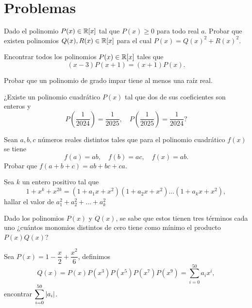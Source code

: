 \section{Problemas}

\begin{problem}
    Dado el polinomio $P(x) \in \mathbb{R} [x]$ tal que $P(x) \geq 0$ para todo real $a$.
    Probar que existen polinomios $Q(x), R(x) \in \mathbb{R} [x]$ para el cual $P(x) = Q(x)^2 + R(x)^2$.
\end{problem}

\begin{problem}
    Encontrar todos los polinomios $P(x) \in \mathbb{R}[x]$ tales que
    \[
        (x - 3)P(x + 1) = (x + 1)P(x).
    \]
\end{problem}

\begin{problem}
    Probar que un polinomio de grado impar tiene al menos una raíz real.
\end{problem}

\begin{problem}
    ¿Existe un polinomio cuadrático $P(x)$ tal que dos de sus coeficientes son enteros y
    \[
        P\left(\frac{1}{2024}\right) = \frac{1}{2025},  \quad P\left(\frac{1}{2025}\right) = \frac{1}{2024} ?
    \]
\end{problem}

\begin{problem}
    Sean $a,b, c$ números reales distintos tales que para el polinomio cuadrático $f(x)$ se tiene
    \[
        f(a) = ab, \quad f(b) = ac, \quad f(x) = ab.
    \]
    Probar que $f(a + b + c) = ab + bc + ca$.
\end{problem}

\begin{problem}
    Sea $k$ un entero positivo tal que
    \[
        1 + x^k + x^{2k} = (1 + a_1 x + x^2)(1 + a_2 x + x^2) \ldots (1 + a_k x + x^2),
    \]
    hallar el valor de $a_1^2 + a_2^2 + \ldots + a_k^2$
\end{problem}

\begin{problem}
    Dado los polinomios $P(x)$ y $Q(x)$, se sabe que estos tienen tres términos cada uno
    ¿cuántos monomios distintos de cero tiene como mínimo el producto $P(x) Q(x)$?
\end{problem}

\begin{problem}
    Sea $P(x) = 1 - \dfrac{x}{2} + \dfrac{x^2}{6}$, definimos
    \[
        Q(x) = P(x)P(x^3)P(x^5)P(x^7)P(x^9) = \sum_{i = 0}^{50} a_i x^i,
    \]
    encontrar $\displaystyle \sum_{i = 0}^{50} |a_i|$.
\end{problem}


